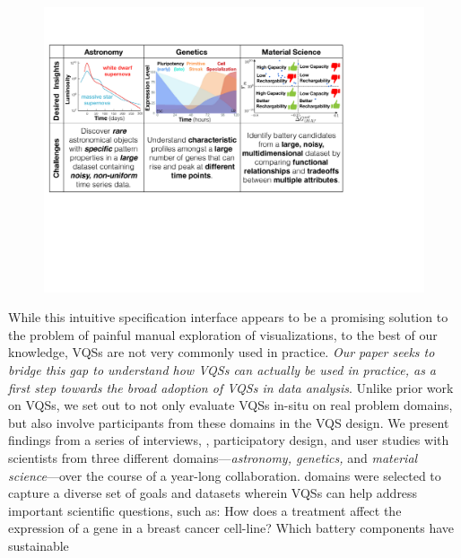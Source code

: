 \vspace{-5pt}
\begin{figure}[ht!]
	\centering
	\includegraphics[width=\linewidth]{figures/science_goal.pdf}
    \vspace{-5pt}
	\caption{}
	\label{science_goal}
	\vspace{-10pt}
\end{figure}
\par While this intuitive specification interface appears to be a promising solution
to the problem of painful manual exploration of visualizations,
to the best of our knowledge, VQSs are not very commonly used in practice.
{\em Our paper seeks to bridge this gap
to understand how VQSs can actually be used in practice,
as a first step towards the broad adoption of VQSs in data analysis}.
Unlike prior work on VQSs,
we set out to not only evaluate VQSs in-situ on
real problem domains, but also involve participants
from these domains in the VQS design.
We present findings from a series of interviews,
, participatory design,
and user studies with scientists from three different domains---{\em astronomy, genetics,} and {\em material science}---over the course of
a year-long collaboration.  domains were selected to capture
a diverse set of goals
and datasets wherein VQSs can help address
important scientific questions, such as:
How does a treatment affect the expression
of a gene in a breast cancer cell-line?
Which battery components have sustainable
